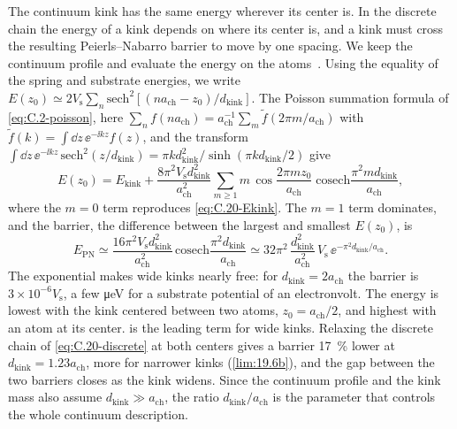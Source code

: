 The continuum kink has the same energy wherever its center is. In the discrete chain the energy of a kink depends on where its center is, and a kink must cross the resulting Peierls--Nabarro barrier to move by one spacing. We keep the continuum profile and evaluate the energy on the atoms~\cite[Eq.~(4)]{fitzgerald2018structure}. Using the equality of the spring and substrate energies, we write $E(z_0) \simeq 2V_{\mathrm{s}}\sum_n\mathrm{sech}^2[(na_{\mathrm{ch}} - z_0)/d_{\mathrm{kink}}]$. The Poisson summation formula of \cref{eq:C.2-poisson}, here $\sum_nf(na_{\mathrm{ch}}) = a_{\mathrm{ch}}^{-1}\sum_m\tilde f(2\pi m/a_{\mathrm{ch}})$ with $\tilde f(k) = \int\dd z\,\ee^{-\ii kz}f(z)$, and the transform $\int\dd z\,\ee^{-\ii kz}\,\mathrm{sech}^2(z/d_{\mathrm{kink}}) = \pi kd_{\mathrm{kink}}^2/\sinh(\pi kd_{\mathrm{kink}}/2)$ give
\begin{equation}
  E(z_0) = E_{\mathrm{kink}} + \frac{8\pi^2V_{\mathrm{s}}d_{\mathrm{kink}}^2}{a_{\mathrm{ch}}^2}\sum_{m\ge1}m\,\cos\frac{2\pi mz_0}{a_{\mathrm{ch}}}\;\mathrm{cosech}\frac{\pi^2md_{\mathrm{kink}}}{a_{\mathrm{ch}}} ,
  \label{eq:C.20-PN}
\end{equation}
where the $m = 0$ term reproduces \cref{eq:C.20-Ekink}. The $m = 1$ term dominates, and the barrier, the difference between the largest and smallest $E(z_0)$, is
\begin{equation}
  E_{\mathrm{PN}} \simeq \frac{16\pi^2V_{\mathrm{s}}d_{\mathrm{kink}}^2}{a_{\mathrm{ch}}^2}\,\mathrm{cosech}\frac{\pi^2d_{\mathrm{kink}}}{a_{\mathrm{ch}}}
  \simeq 32\pi^2\,\frac{d_{\mathrm{kink}}^2}{a_{\mathrm{ch}}^2}\,V_{\mathrm{s}}\,\ee^{-\pi^2d_{\mathrm{kink}}/a_{\mathrm{ch}}} .
  \label{eq:C.20-EPN}
\end{equation}
The exponential makes wide kinks nearly free: for $d_{\mathrm{kink}} = 2a_{\mathrm{ch}}$ the barrier is $3\times10^{-6}V_{\mathrm{s}}$, a few \si{\micro eV} for a substrate potential of an electronvolt. The energy is lowest with the kink centered between two atoms, $z_0 = a_{\mathrm{ch}}/2$, and highest with an atom at its center.  is the leading term for wide kinks. Relaxing the discrete chain of \cref{eq:C.20-discrete} at both centers gives a barrier \SI{17}{\percent} lower at $d_{\mathrm{kink}} = 1.23a_{\mathrm{ch}}$, more for narrower kinks (\cref{lim:19.6b}), and the gap between the two barriers closes as the kink widens. Since the continuum profile and the kink mass also assume $d_{\mathrm{kink}} \gg a_{\mathrm{ch}}$, the ratio $d_{\mathrm{kink}}/a_{\mathrm{ch}}$ is the parameter that controls the whole continuum description.
